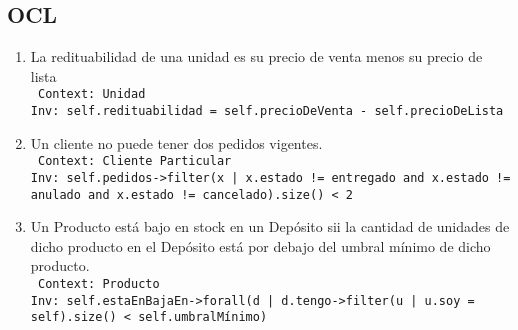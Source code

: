 \subsection{OCL}

\newcommand{\ocldescription}[1]{\renewcommand{\givenocldescription}{#1}}
\newcommand{\oclcontext}[1]{\renewcommand{\givenoclcontext}{#1}}
\newcommand{\oclbody}[1]{\renewcommand{\givenoclbody}{#1}}
\newcommand{\givenocldescription}{REQUIRED!}
\newcommand{\givenoclcontext}{-}
\newcommand{\givenoclbody}{-}

\newenvironment{listocl}{\begin{enumerate}}{\end{enumerate}}

\newenvironment{itemocl}
{\item }{
\givenocldescription \\
\texttt{
Context: \givenoclcontext \\
Inv: \givenoclbody
}}

\begin{listocl}
  \begin{itemocl}
   \ocldescription{La redituabilidad de una unidad es su precio de venta menos su precio de lista}
   \oclcontext{Unidad}
   \oclbody{self.redituabilidad = self.precioDeVenta - self.precioDeLista}
  \end{itemocl}
  
  \begin{itemocl}
   \ocldescription{Un cliente no puede tener dos pedidos vigentes.}
   \oclcontext{Cliente Particular}
   \oclbody{self.pedidos->filter(x | x.estado != entregado and x.estado != anulado and x.estado != cancelado).size() < 2}
  \end{itemocl}
  
  \begin{itemocl}
   \ocldescription{Un Producto está bajo en stock en un Depósito sii la cantidad de unidades de dicho producto en el Depósito está por debajo del umbral mínimo de dicho producto.}
   \oclcontext{Producto}
   \oclbody{self.estaEnBajaEn->forall(d | d.tengo->filter(u | u.soy = self).size() < self.umbralMínimo)}
  \end{itemocl}
  
\end{listocl}